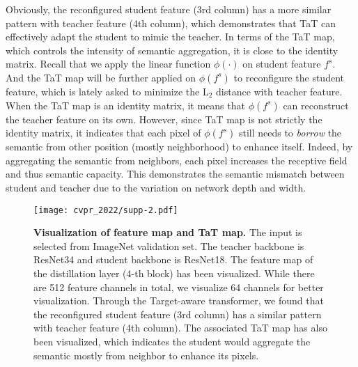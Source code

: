 \documentclass[10pt,onecolumn,letterpaper]{article}
\begin{document}
Obviously, the reconfigured student feature (3rd column) has a more similar pattern with teacher feature (4th column), which demonstrates that TaT can effectively adapt the student to mimic the teacher. In terms of the TaT map, which controls the intensity of semantic aggregation, it is close to the identity matrix. Recall that we apply the linear function $\phi(\cdot)$ on student feature $f^s$.
And the TaT map will be further applied on $\phi(f^{s})$ to reconfigure the student feature, which is lately asked to minimize the L$_2$ distance with teacher feature. When the TaT map is an identity matrix, it means that $\phi(f^{s})$ can reconstruct the teacher feature on its own. However, since TaT map is not strictly the identity matrix, it indicates that each pixel of $\phi(f^{s})$ still needs to \textit{borrow} the semantic from other position (mostly neighborhood) to enhance itself. Indeed, by aggregating the semantic from neighbors, each pixel increases the receptive field and thus semantic capacity. This demonstrates the semantic mismatch between student and teacher due to the variation on network depth and width.

\begin{figure*}[t]
    \centering
    \texttt{[image: cvpr\_2022/supp-2.pdf]}
    \vspace{-1mm}
    \caption{
    \textbf{Visualization of feature map and TaT map.} The input is selected from ImageNet validation set. The teacher backbone is ResNet34 and student backbone is ResNet18. The feature map of the distillation layer (4-th block) has been visualized. While there are 512 feature channels in total, we visualize 64 channels for better visualization. Through the Target-aware transformer, we found that the reconfigured student feature (3rd column) has a similar pattern with teacher feature (4th column). 
    The associated TaT map has also been visualized, which indicates the student would aggregate the semantic mostly from neighbor to enhance its pixels. 
    }
    \label{fig:supp_vis}
    \vspace{-4mm}
\end{figure*}
{\footnotesize


}
\end{document}
